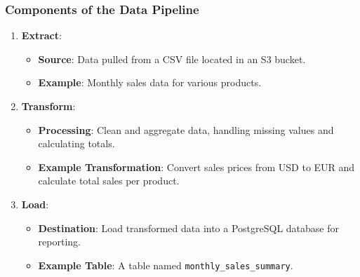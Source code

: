 \documentclass[aspectratio=169]{beamer}
\begin{document}
\begin{frame}
    \frametitle{Components of the Data Pipeline}
    \begin{enumerate}
        \item \textbf{Extract}:
            \begin{itemize}
                \item \textbf{Source}: Data pulled from a CSV file located in an S3 bucket.
                \item \textbf{Example}: Monthly sales data for various products.
            \end{itemize}
        \item \textbf{Transform}:
            \begin{itemize}
                \item \textbf{Processing}: Clean and aggregate data, handling missing values and calculating totals.
                \item \textbf{Example Transformation}: Convert sales prices from USD to EUR and calculate total sales per product.
            \end{itemize}
        \item \textbf{Load}:
            \begin{itemize}
                \item \textbf{Destination}: Load transformed data into a PostgreSQL database for reporting.
                \item \textbf{Example Table}: A table named \texttt{monthly\_sales\_summary}.
            \end{itemize}
    \end{enumerate}
\end{frame}
\end{document}
